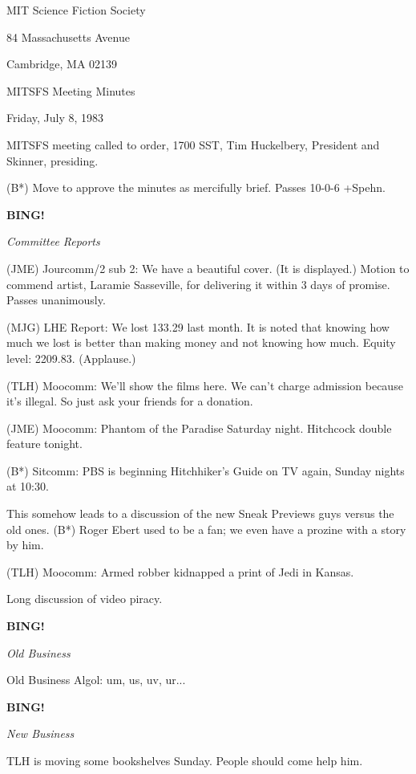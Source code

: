 \documentclass[12pt]{article}
\newcommand{\bing}{{\bf BING!} }
\newcommand{\goto}[1]{\bing \vskip 12pt \centerline{{\em{#1}}}}
\begin{document}
\begin{center}

MIT Science Fiction Society 

84 Massachusetts Avenue

Cambridge, MA 02139

\vspace{12pt}

MITSFS Meeting Minutes 

Friday, July 8, 1983

\end{center}
 
\vspace{18pt}

\setlength{\parskip}{6pt}

\noindent
MITSFS meeting called to order, 1700 SST,
Tim Huckelbery, President and Skinner, presiding.

(B*) Move to approve the minutes as mercifully brief. Passes 10-0-6 +Spehn.

\goto{Committee Reports}

(JME) Jourcomm/2 sub 2: We have a beautiful cover. (It is displayed.) Motion to commend artist, Laramie Sasseville, for delivering it within 3 days of promise. Passes unanimously.

(MJG) LHE Report: We lost 133.29 last month. It is noted that knowing how much we lost is better than making money and not knowing how much. Equity level: 2209.83. (Applause.)

(TLH) Moocomm:  We'll show the films here. We can't charge admission because it's illegal. So just ask your friends for a donation.

(JME) Moocomm: Phantom of the Paradise Saturday night. Hitchcock double feature tonight.

(B*) Sitcomm: PBS is beginning Hitchhiker's Guide on TV again, Sunday nights at 10:30.

This somehow leads to a discussion of the new Sneak Previews guys versus the old ones. (B*) Roger Ebert used to be a fan; we even have a prozine with a story by him.

(TLH) Moocomm: Armed robber kidnapped a print of Jedi in Kansas.

Long discussion of video piracy.

\goto{Old Business}

Old Business Algol: um, us, uv, ur...

\goto{New Business}

TLH is moving some bookshelves Sunday. People should come help him.
\end{document}
